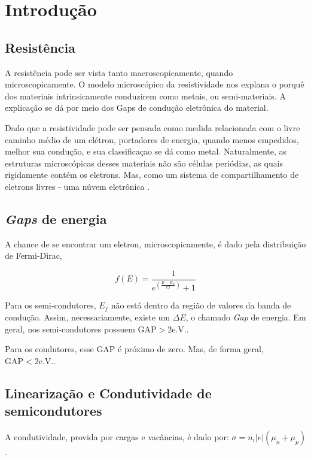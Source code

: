 \documentclass[11pt]{article}
\date{\today}
\title{}
\begin{document}
\tableofcontents

\section{Introdução}
\label{sec:orga917fff}
\subsection{Resistência}
\label{sec:org2295ef2}
A resistência pode ser vista tanto macroscopicamente, quando
microscopicamente. O modelo microscópico da resistividade nos
explana o porquê dos materiais intrinsicamente conduzirem como
metais, ou semi-materiais. A explicação se dá por meio dos Gaps de
condução eletrônica do material.

Dado que a resistividade pode ser
pensada como medida relacionada com o livre caminho médio de um
elétron, portadores de energia, quando menos empedidos, melhor sua
condução, e sua classificaçao se dá como metal. Naturalmente, as
estruturas microscópicas desses materiais não são células
periódias, as quais rigidamente contém os eletrons. Mas, como um
sistema de compartilhamento de eletrons livres - uma núvem
eletrônica \cite{schrodinger1935present}.

\subsection{\emph{Gaps} de energia}
\label{sec:orga315307}
A chance de se encontrar um eletron, microscopicamente, é dado pela
distribuição de Fermi-Dirac,

   \begin{equation}
f(E) = \dfrac{1}{e^{\left(\frac{E-E_F}{kT} \right)}+1}
   \end{equation}

Para os semi-condutores, \(E_f\) não está dentro da região de valores da
banda de condução. Assim, necessariamente, existe um \(\Delta E\), o
chamado \emph{Gap} de energia. Em geral, nos semi-condutores possuem
\(\textrm{GAP} > 2 \textrm{e.V.}\).

Para os condutores, esse GAP é próximo de zero. Mas, de forma
geral, \(\textrm{GAP} < 2 \textrm{e.V.}\).

\subsection{Linearização e Condutividade de semicondutores}
\label{sec:org2cf9c92}
A condutividade, provida por cargas e vacâncias, é dado por:
\(\sigma = n_i |e| (\mu_n + \mu_p)\).
\end{document}
